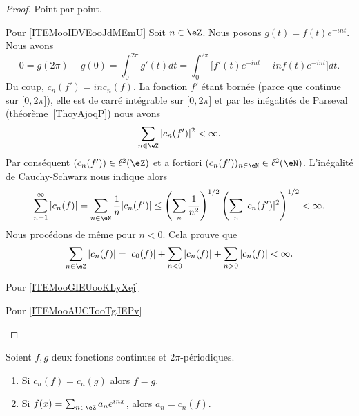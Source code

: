 \begin{proof}
	Point par point.
	\begin{subproof}
		\item[Pour \ref{ITEMooIDVEooJdMEmU}]
		Soit \( n\in \eZ\). Nous posons \( g(t)=f(t) e^{-int}\). Nous avons
		\begin{equation}
			0=g(2\pi)-g(0)=\int_0^{2\pi}g'(t)dt=\int_0^{2\pi}\big[ f'(t) e^{-int}-inf(t) e^{-int} \big]dt.
		\end{equation}
		Du coup, \( c_n(f')=inc_n(f)\). La fonction \( f'\) étant bornée (parce que continue sur \( \mathopen[ 0 , 2\pi \mathclose]\)), elle est de carré intégrable sur \( \mathopen[ 0 , 2\pi \mathclose]\) et par les inégalités de Parseval (théorème~\ref{ThoyAjoqP}) nous avons
		\begin{equation}
			\sum_{n\in \eZ}| c_n(f') |^2<\infty.
		\end{equation}
		Par conséquent \( (c_n(f'))\in \ell^2(\eZ)\) et a fortiori \( (c_n(f'))_{n\in \eN}\in \ell^2(\eN)\). L'inégalité de Cauchy-Schwarz nous indique alors
		\begin{equation}
			\sum_{n=1}^{\infty}| c_n(f) |=\sum_{n\in \eN}\frac{1}{ n }| c_n(f') |\leq \left( \sum_n\frac{1}{ n^2 } \right)^{1/2}\left( \sum_{n}| c_n(f') |^2 \right)^{1/2}<\infty.
		\end{equation}
		Nous procédons de même pour \( n<0\). Cela prouve que
		\begin{equation}
			\sum_{n\in \eZ}| c_n(f) | = |c_0(f)|+\sum_{n<0}| c_n(f) |+\sum_{n>0} | c_n(f) |  <\infty.
		\end{equation}
		\item[Pour \ref{ITEMooGIEUooKLyXej}]
		\item[Pour \ref{ITEMooAUCTooTgJEPv}]
	\end{subproof}
\end{proof}

\begin{corollary}   \label{CordgtXlC}
	Soient \( f,g\) deux fonctions continues et \( 2\pi\)-périodiques.
	\begin{enumerate}
		\item       \label{ITEMooPLTIooSDykYF}
		      Si \( c_n(f)=c_n(g)\) alors \( f=g\).
		\item       \label{ITEMooQMMSooEpIFbt}
		      Si \( f(x)=\sum_{n\in \eZ}a_n e^{inx}\), alors \( a_n=c_n(f)\).
	\end{enumerate}
\end{corollary}

